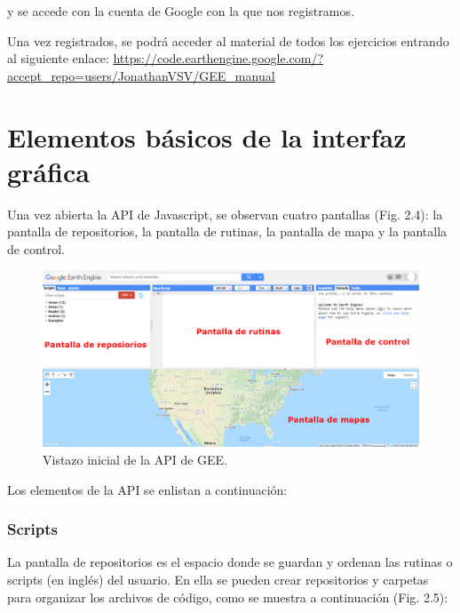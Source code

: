 \documentclass[
  12pt,
  letterpaper,
  twoside]{book}
\begin{document}
y se accede con la cuenta de Google con la que nos registramos.

Una vez registrados, se podrá acceder al material de todos los ejercicios entrando al siguiente enlace: \url{https://code.earthengine.google.com/?accept_repo=users/JonathanVSV/GEE_manual}

\hypertarget{elementos-buxe1sicos-de-la-interfaz-gruxe1fica}{%
\section{Elementos básicos de la interfaz gráfica}\label{elementos-buxe1sicos-de-la-interfaz-gruxe1fica}}

Una vez abierta la API de Javascript, se observan cuatro pantallas (Fig. 2.4): la pantalla de repositorios, la pantalla de rutinas, la pantalla de mapa y la pantalla de control.

\begin{figure}[btp]

{\centering \includegraphics[width=1\linewidth]{Img/GEE_inicio_API2} 

}

\caption{Vistazo inicial de la API de GEE.}\label{fig:unnamed-chunk-5}
\end{figure}

Los elementos de la API se enlistan a continuación:

\hypertarget{scripts}{%
\subsubsection*{Scripts}\label{scripts}}

La pantalla de repositorios es el espacio donde se guardan y ordenan las rutinas o scripts (en inglés) del usuario. En ella se pueden crear repositorios y carpetas para organizar los archivos de código, como se muestra a continuación (Fig. 2.5):
\end{document}

